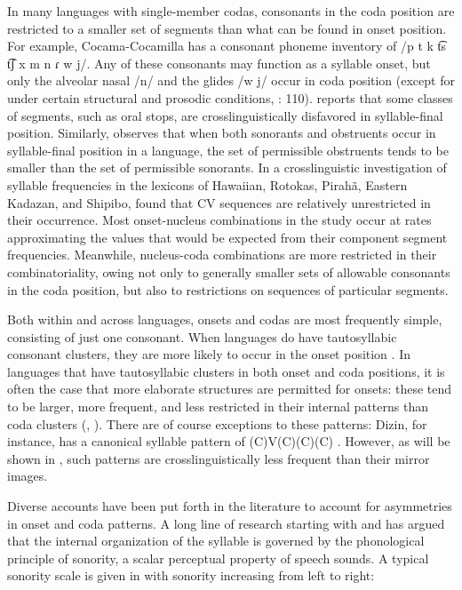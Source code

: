   In many languages with single-member codas, consonants in the coda position are restricted to a smaller set of segments than what can be found in onset position. For example, Cocama-Cocamilla has a consonant phoneme inventory of /p t k t͡s t͡ʃ x m n ɾ w j/. Any of these consonants may function as a syllable onset, but only the alveolar nasal /n/ and the glides /w j/ occur in coda position (except for under certain structural and prosodic conditions,  \citealt{VallejosYopán2010}: 110). \citet{Krakow1999} reports that some classes of segments, such as oral stops, are crosslinguistically disfavored in syllable-final position. Similarly, \citet[301]{Clements1990} observes that when both sonorants and obstruents occur in syllable-final position in a language, the set of permissible obstruents tends to be smaller than the set of permissible sonorants. In a crosslinguistic investigation of syllable frequencies in the lexicons of Hawaiian, Rotokas, Pirahã, Eastern Kadazan, and Shipibo, \citet{MaddiesonPrecoda1992} found that CV sequences are relatively unrestricted in their occurrence. Most onset-nucleus combinations in the study occur at rates approximating the values that would be expected from their component segment frequencies. Meanwhile, nucleus-coda combinations are more restricted in their combinatoriality, owing not only to generally smaller sets of allowable consonants in the coda position, but also to restrictions on sequences of particular segments.

  Both within and across languages, onsets and codas are most frequently simple, consisting of just one consonant. When languages do have tautosyllabic consonant clusters, they are more likely to occur in the onset position \citep{Blevins2006}. In languages that have tautosyllabic clusters in both onset and coda positions, it is often the case that more elaborate structures are permitted for onsets: these tend to be larger, more frequent, and less restricted in their internal patterns than coda clusters (\citealt{Greenberg19651978}, \citealt{Blevins2006}). There are of course exceptions to these patterns: Dizin, for instance, has a canonical syllable pattern of (C)V(C)(C)(C) \citep{Beachy2005}. However, as will be shown in , such patterns are crosslinguistically less frequent than their mirror images.

  Diverse accounts have been put forth in the literature to account for asymmetries in onset and coda patterns. A long line of research starting with \citet{Sievers1881} and \citet{Jespersen1904} has argued that the internal organization of the syllable is governed by the phonological principle of sonority, a scalar perceptual property of speech sounds. A typical sonority scale is given in  with sonority increasing from left to right:

